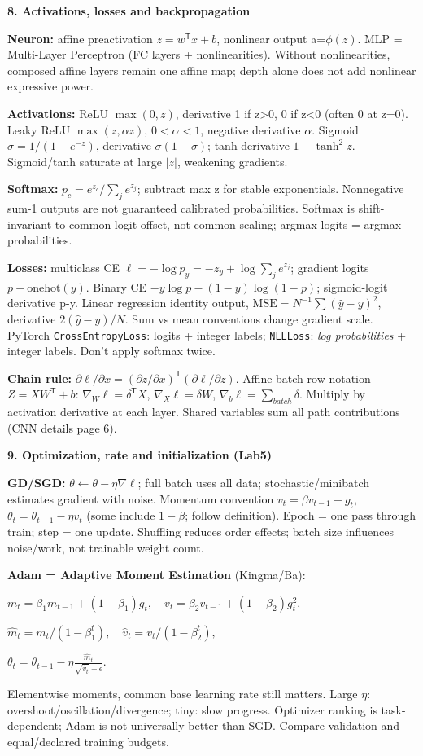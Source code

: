 \documentclass[a4paper]{article}
\newcommand{\key}[1]{\textbf{#1}}
\newcommand{\Topic}[1]{\par\vspace{1.7pt}\noindent
  {\fontsize{7.7}{8.0}\selectfont\bfseries #1}\par\vspace{0.3pt}}
\newcommand{\eq}[1]{\par\noindent\mbox{\(\displaystyle #1\)}\par}
\newcommand{\trans}{^{\mathsf T}}
\newcounter{sheet}
\newcounter{sheetcolumn}
\newlength{\colwidth}
\newenvironment{sheetcol}[1][7.0]{\stepcounter{sheetcolumn}
  \begin{lrbox}{\columnbox}\begin{minipage}[t]{\colwidth}\vspace{0pt}
  \fontsize{#1}{\dimexpr#1pt+0.6pt\relax}\selectfont}
  {\end{minipage}\end{lrbox}
  \typeout{CV1COL|\thesheet|\thesheetcolumn|\the\dimexpr\ht\columnbox+\dp\columnbox\relax}
  \usebox{\columnbox}\ignorespacesafterend}
\begin{document}
\begin{sheetcol}
\Topic{8. Activations, losses and backpropagation}
\key{Neuron:} affine preactivation \(z=w\trans x+b\), nonlinear output a=\(\phi(z)\). MLP = Multi-Layer Perceptron (FC layers + nonlinearities). Without nonlinearities, composed affine layers remain one affine map; depth alone does not add nonlinear expressive power.

\key{Activations:} ReLU \(\max(0,z)\), derivative 1 if z>0, 0 if z<0 (often 0 at z=0). Leaky ReLU \(\max(z,\alpha z)\), \(0<\alpha<1\), negative derivative \(\alpha\). Sigmoid \(\sigma=1/(1+e^{-z})\), derivative \(\sigma(1-\sigma)\); tanh derivative \(1-\tanh^2z\). Sigmoid/tanh saturate at large \(|z|\), weakening gradients.

\key{Softmax:} \(p_c=e^{z_c}/\sum_je^{z_j}\); subtract max z for stable exponentials. Nonnegative sum-1 outputs are not guaranteed calibrated probabilities. Softmax is shift-invariant to common logit offset, not common scaling; argmax logits = argmax probabilities.

\key{Losses:} multiclass CE \(\ell=-\log p_y=-z_y+\log\sum_j e^{z_j}\); gradient logits \(p-\mathrm{onehot}(y)\). Binary CE \(-y\log p-(1-y)\log(1-p)\); sigmoid-logit derivative p-y. Linear regression identity output, \(\mathrm{MSE}=N^{-1}\sum(\hat y-y)^2\), derivative \(2(\hat y-y)/N\). Sum vs mean conventions change gradient scale. PyTorch \texttt{CrossEntropyLoss}: logits + integer labels; \texttt{NLLLoss}: \emph{log probabilities} + integer labels. Don't apply softmax twice.

\key{Chain rule:} \(\partial\ell/\partial x=(\partial z/\partial x)\trans(\partial\ell/\partial z)\). Affine batch row notation \(Z=XW\trans+b\): \(\nabla_W\ell=\delta\trans X\), \(\nabla_X\ell=\delta W\), \(\nabla_b\ell=\sum_{batch}\delta\). Multiply by activation derivative at each layer. Shared variables sum all path contributions (CNN details page 6).

\Topic{9. Optimization, rate and initialization (Lab5)}
\key{GD/SGD:} \(\theta\leftarrow\theta-\eta\nabla\ell\); full batch uses all data; stochastic/minibatch estimates gradient with noise. Momentum convention \(v_t=\beta v_{t-1}+g_t\), \(\theta_t=\theta_{t-1}-\eta v_t\) (some include \(1-\beta\); follow definition). Epoch = one pass through train; step = one update. Shuffling reduces order effects; batch size influences noise/work, not trainable weight count.

\key{Adam = Adaptive Moment Estimation} (Kingma/Ba):
\eq{m_t=\beta_1m_{t-1}+(1-\beta_1)g_t,\quad
 v_t=\beta_2v_{t-1}+(1-\beta_2)g_t^2,}
\eq{\hat m_t=m_t/(1-\beta_1^t),\quad \hat v_t=v_t/(1-\beta_2^t),}
\eq{\theta_t=\theta_{t-1}-\eta\frac{\hat m_t}{\sqrt{\hat v_t}+\epsilon}.}
Elementwise moments, common base learning rate still matters. Large \(\eta\): overshoot/oscillation/divergence; tiny: slow progress. Optimizer ranking is task-dependent; Adam is not universally better than SGD. Compare validation and equal/declared training budgets.


\end{sheetcol}
\end{document}
